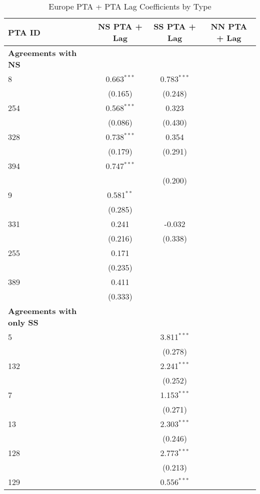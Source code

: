 \begin{table}[htbp]
    \centering
    \caption{Europe PTA + PTA Lag Coefficients by Type}
    \label{tab:europe_pta}
    \begin{adjustbox}{max width=\textwidth}
    \begin{tabular}{lccc}
    \hline
    \textbf{PTA ID} & \textbf{NS PTA + Lag} & \textbf{SS PTA + Lag} & \textbf{NN PTA + Lag} \\
    \hline
    \textbf{Agreements with NS} &  &  &  \\
    \hline
    8   & 0.663$^{\ast\ast\ast}$ & 0.783$^{\ast\ast\ast}$ &  \\
    & (0.165) & (0.248) &  \\
    254 & 0.568$^{\ast\ast\ast}$ & 0.323 &  \\
    & (0.086) & (0.430) &  \\
    328 & 0.738$^{\ast\ast\ast}$ & 0.354 &  \\
    & (0.179) & (0.291) &  \\
    394 & 0.747$^{\ast\ast\ast}$ &  &  \\
    &  & (0.200) &  \\
    9   & 0.581$^{\ast\ast}$ &  &  \\
    & (0.285) &  &  \\
    331   & 0.241 & -0.032 &  \\
    & (0.216) & (0.338) &  \\
    255   & 0.171 &  &  \\
    & (0.235) &  &  \\
    389   & 0.411 &  &  \\
    & (0.333) &  &  \\
    \hline
    \textbf{Agreements with only SS} &  &  &  \\
    \hline
    5   &  & 3.811$^{\ast\ast\ast}$ &  \\
    &  & (0.278) &  \\
    132 &  & 2.241$^{\ast\ast\ast}$ &  \\
    &  & (0.252) &  \\
    7   &  & 1.153$^{\ast\ast\ast}$ &  \\
    &  & (0.271) &  \\
    13  &  & 2.303$^{\ast\ast\ast}$ &  \\
    &  & (0.246) &  \\
    128 &  & 2.773$^{\ast\ast\ast}$ &  \\
    &  & (0.213) &  \\
    129 &  & 0.556$^{\ast\ast\ast}$ &  \\

\end{tabular}
\end{adjustbox}
\end{table}
